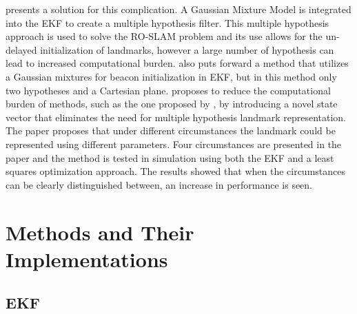 \documentclass[conference]{IEEEtran}
\begin{document}
	\cite{Caballero2010} presents a solution for this complication. A Gaussian Mixture Model is integrated into the EKF to create a multiple hypothesis filter.  This multiple hypothesis approach is used to solve the RO-SLAM problem and its use allows for the un-delayed initialization of landmarks, however a large number of hypothesis can lead to increased computational burden. \cite{Geneve2015} also puts forward a method that utilizes a Gaussian mixtures for beacon initialization in EKF, but in this method only two hypotheses and a Cartesian plane. \cite{Ahmad2011a} proposes to reduce the computational burden of methods, such as the one proposed by \cite{Caballero2010}, by introducing a novel state vector that eliminates the need for multiple hypothesis landmark representation. The paper proposes that under different circumstances the landmark could be represented using different parameters. Four circumstances are presented in the paper and the method is tested in simulation using both the EKF and a least squares optimization approach. The results showed that when the circumstances can be clearly distinguished between, an increase in performance is seen.
	
	
	

	\section{Methods and Their Implementations}
	
	\subsection{EKF}
	
	
	
\end{document}

